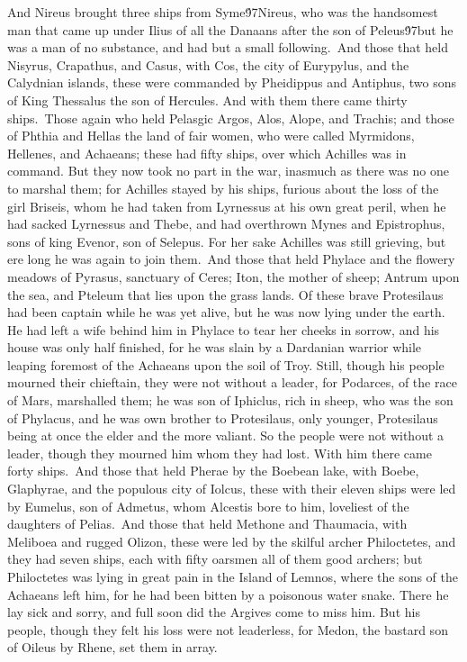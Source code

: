 {And Nireus brought three ships from Syme\'97Nireus, who was the handsomest man that came up under Ilius of all the Danaans after the son of Peleus\'97but he was a man of no substance, and had but a small following.\
And those that held Nisyrus, Crapathus, and Casus, with Cos, the city of Eurypylus, and the Calydnian islands, these were commanded by Pheidippus and Antiphus, two sons of King Thessalus the son of Hercules. And with them there came thirty ships.\
Those again who held Pelasgic Argos, Alos, Alope, and Trachis; and those of Phthia and Hellas the land of fair women, who were called Myrmidons, Hellenes, and Achaeans; these had fifty ships, over which Achilles was in command. But they now took no part in the war, inasmuch as there was no one to marshal them; for Achilles stayed by his ships, furious about the loss of the girl Briseis, whom he had taken from Lyrnessus at his own great peril, when he had sacked Lyrnessus and Thebe, and had overthrown Mynes and Epistrophus, sons of king Evenor, son of Selepus. For her sake Achilles was still grieving, but ere long he was again to join them.\
And those that held Phylace and the flowery meadows of Pyrasus, sanctuary of Ceres; Iton, the mother of sheep; Antrum upon the sea, and Pteleum that lies upon the grass lands. Of these brave Protesilaus had been captain while he was yet alive, but he was now lying under the earth. He had left a wife behind him in Phylace to tear her cheeks in sorrow, and his house was only half finished, for he was slain by a Dardanian warrior while leaping foremost of the Achaeans upon the soil of Troy. Still, though his people mourned their chieftain, they were not without a leader, for Podarces, of the race of Mars, marshalled them; he was son of Iphiclus, rich in sheep, who was the son of Phylacus, and he was own brother to Protesilaus, only younger, Protesilaus being at once the elder and the more valiant. So the people were not without a leader, though they mourned him whom they had lost. With him there came forty ships.\
And those that held Pherae by the Boebean lake, with Boebe, Glaphyrae, and the populous city of Iolcus, these with their eleven ships were led by Eumelus, son of Admetus, whom Alcestis bore to him, loveliest of the daughters of Pelias.\
And those that held Methone and Thaumacia, with Meliboea and rugged Olizon, these were led by the skilful archer Philoctetes, and they had seven ships, each with fifty oarsmen all of them good archers; but Philoctetes was lying in great pain in the Island of Lemnos, where the sons of the Achaeans left him, for he had been bitten by a poisonous water snake. There he lay sick and sorry, and full soon did the Argives come to miss him. But his people, though they felt his loss were not leaderless, for Medon, the bastard son of Oileus by Rhene, set them in array.\
}
